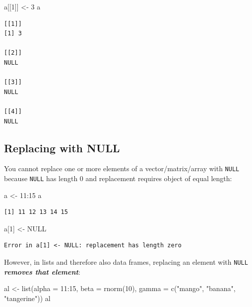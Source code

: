 \documentclass[
]{book}
\newenvironment{Shaded}{\begin{snugshade}}{\end{snugshade}}
\newcommand{\AttributeTok}[1]{\textcolor[rgb]{0.77,0.63,0.00}{#1}}
\newcommand{\ConstantTok}[1]{\textcolor[rgb]{0.00,0.00,0.00}{#1}}
\newcommand{\DecValTok}[1]{\textcolor[rgb]{0.00,0.00,0.81}{#1}}
\newcommand{\FunctionTok}[1]{\textcolor[rgb]{0.00,0.00,0.00}{#1}}
\newcommand{\NormalTok}[1]{#1}
\newcommand{\OtherTok}[1]{\textcolor[rgb]{0.56,0.35,0.01}{#1}}
\newcommand{\SpecialCharTok}[1]{\textcolor[rgb]{0.00,0.00,0.00}{#1}}
\newcommand{\StringTok}[1]{\textcolor[rgb]{0.31,0.60,0.02}{#1}}
\begin{document}
\begin{Shaded}
\begin{Highlighting}[]
\NormalTok{a[[}\DecValTok{1}\NormalTok{]] }\OtherTok{\textless{}{-}} \DecValTok{3}
\NormalTok{a}
\end{Highlighting}
\end{Shaded}

\begin{verbatim}
[[1]]
[1] 3

[[2]]
NULL

[[3]]
NULL

[[4]]
NULL
\end{verbatim}

\hypertarget{replacing-with-null}{%
\subsection{Replacing with NULL}\label{replacing-with-null}}

You cannot replace one or more elements of a vector/matrix/array with \texttt{NULL} because \texttt{NULL} has length 0 and replacement requires object of equal length:

\begin{Shaded}
\begin{Highlighting}[]
\NormalTok{a }\OtherTok{\textless{}{-}} \DecValTok{11}\SpecialCharTok{:}\DecValTok{15}
\NormalTok{a}
\end{Highlighting}
\end{Shaded}

\begin{verbatim}
[1] 11 12 13 14 15
\end{verbatim}

\begin{Shaded}
\begin{Highlighting}[]
\NormalTok{a[}\DecValTok{1}\NormalTok{] }\OtherTok{\textless{}{-}} \ConstantTok{NULL}
\end{Highlighting}
\end{Shaded}

\begin{verbatim}
Error in a[1] <- NULL: replacement has length zero
\end{verbatim}

However, in lists and therefore also data frames, replacing an element with \texttt{NULL} \textbf{\emph{removes that element}}:

\begin{Shaded}
\begin{Highlighting}[]
\NormalTok{al }\OtherTok{\textless{}{-}} \FunctionTok{list}\NormalTok{(}\AttributeTok{alpha =} \DecValTok{11}\SpecialCharTok{:}\DecValTok{15}\NormalTok{,}
           \AttributeTok{beta =} \FunctionTok{rnorm}\NormalTok{(}\DecValTok{10}\NormalTok{),}
           \AttributeTok{gamma =} \FunctionTok{c}\NormalTok{(}\StringTok{"mango"}\NormalTok{, }\StringTok{"banana"}\NormalTok{, }\StringTok{"tangerine"}\NormalTok{))}
\NormalTok{al}
\end{Highlighting}
\end{Shaded}
\end{document}
